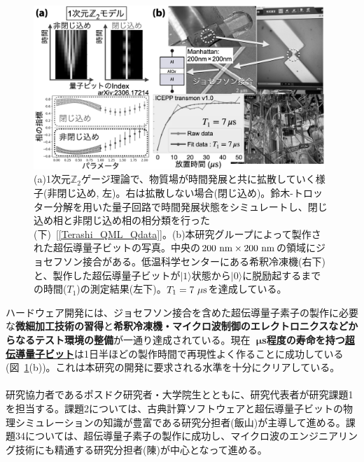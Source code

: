 \documentclass[11pt,a4j,dvipdfmx]{jarticle} 					%
\newcommand{\研究課題名}{誤り耐性量子コンピュータに向けた誤り訂正技術の開発(仮)}
\newcommand{\研究機関名}{東京大学}
\newcommand{\研究代表者氏名}{寺師弘二}
\newcommand{\研究期間の最終元号年度}{10}  %
\newcommand{\mybf}[1]{{\bfseries\sffamily#1}}
\newcommand{\maruone}{\raise0.2mm\hbox{\textcircled{\scriptsize{1}}}}
\newcommand{\marutwo}{\raise0.2mm\hbox{\textcircled{\scriptsize{2}}}}
\newcommand{\maruthree}{\raise0.2mm\hbox{\textcircled{\scriptsize{3}}}}
\newcommand{\marufour}{\raise0.2mm\hbox{\textcircled{\scriptsize{4}}}}
\begin{document}
\begin{figure}
	\begin{center}
		\vspace{-0.8cm}
		\includegraphics[width=11cm]{figs/result.png}\vspace{-0.4cm}
		\caption{\small{(a)1次元$\mathbb{Z}_2$ゲージ理論で、物質場が時間発展と共に拡散していく様子(非閉じ込め, 左)。右は拡散しない場合(閉じ込め)。鈴木-トロッター分解を用いた量子回路で時間発展状態をシミュレートし、閉じ込め相と非閉じ込め相の相分類を行った(下)~[\ref{Terashi_QML_Qdata}]。(b)本研究グループによって製作された超伝導量子ビットの写真。中央の$200~{\rm nm}\times200~{\rm nm}$の領域にジョセフソン接合がある。低温科学センターにある希釈冷凍機(右下)と、製作した超伝導量子ビットが$|1\rangle$状態から$|0\rangle$に脱励起するまでの時間($T_1$)の測定結果(左下)。$T_1=7~\mu{\rm s}$を達成している。}
		\label{fig:status}}\vspace{-1cm}
	\end{center}
\end{figure}

ハードウェア開発には、ジョセフソン接合を含めた超伝導量子素子の製作に必要な\mybf{微細加工技術の習得}と\mybf{希釈冷凍機・マイクロ波制御のエレクトロニクスなどからなるテスト環境の整備}が一通り達成されている。現在\mybf{10~$\boldsymbol{\mu}$s程度の寿命を持つ\ul{超伝導量子ビット}}は1日半ほどの製作時間で再現性よく作ることに成功している(図~\ref{fig:status}(b))。これは本研究の開発に要求される水準を十分にクリアしている。 \vspace{-3mm}\\


\\
研究協力者であるポスドク研究者・大学院生とともに、研究代表者が研究課題{\maruone}を担当する。課題{\marutwo}については、古典計算ソフトウェアと超伝導量子ビットの物理シミュレーションの知識が豊富である研究分担者(飯山)が主導して進める。課題{\maruthree}{\marufour}については、超伝導量子素子の製作に成功し、マイクロ波のエンジニアリング技術にも精通する研究分担者(陳)が中心となって進める。
\end{document}
